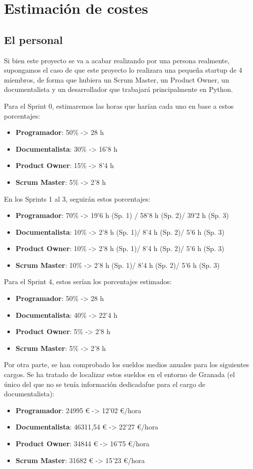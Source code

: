 \section{Estimación de costes}
\subsection{El personal}
Si bien este proyecto se va a acabar realizando por una persona realmente, supongamos el caso de que este proyecto lo realizara una pequeña startup de 4 miembros, de forma que hubiera un Scrum Master, un Product Owner, un documentalista y un desarrollador que trabajará principalmente en Python.

Para el Sprint 0, estimaremos las horas que harían cada uno en base a estos porcentajes:
\begin{itemize}
	\item \textbf{Programador}: 50\% -> 28 h
	\item \textbf{Documentalista}: 30\% -> 16'8 h
	\item \textbf{Product Owner}: 15\% -> 8'4 h
	\item \textbf{Scrum Master}: 5\% -> 2'8 h
\end{itemize}

En los Sprints 1 al 3, seguirán estos porcentajes:
\begin{itemize}
	\item \textbf{Programador}: 70\% -> 19'6 h (Sp. 1) / 58'8 h (Sp. 2)/ 39'2 h (Sp. 3)
	\item \textbf{Documentalista}: 10\% -> 2'8 h (Sp. 1)/ 8'4 h (Sp. 2)/ 5'6 h (Sp. 3)
	\item \textbf{Product Owner}: 10\% -> 2'8 h (Sp. 1)/ 8'4 h (Sp. 2)/ 5'6 h (Sp. 3)
	\item \textbf{Scrum Master}: 10\% -> 2'8 h (Sp. 1)/ 8'4 h (Sp. 2)/ 5'6 h (Sp. 3)
\end{itemize}

Para el Sprint 4, estos serían los porcentajes estimados:
\begin{itemize}
	\item \textbf{Programador}: 50\% -> 28 h
	\item \textbf{Documentalista}: 40\% -> 22'4 h
	\item \textbf{Product Owner}: 5\% -> 2'8 h
	\item \textbf{Scrum Master}: 5\% -> 2'8 h
\end{itemize}

Por otra parte, se han comprobado los sueldos medios anuales para los siguientes cargos. Se ha tratado de localizar estos sueldos en el entorno de Granada (el único del que no se tenía información dedicadafue para el cargo de documentalista):
\begin{itemize}
	\item \textbf{Programador}: 24995 € -> 12'02 €/hora
	\item \textbf{Documentalista}: 46311,54 € -> 22'27 €/hora
	\item \textbf{Product Owner}: 34844 € -> 16'75 €/hora
	\item \textbf{Scrum Master}: 31682 € -> 15'23 €/hora
\end{itemize}

